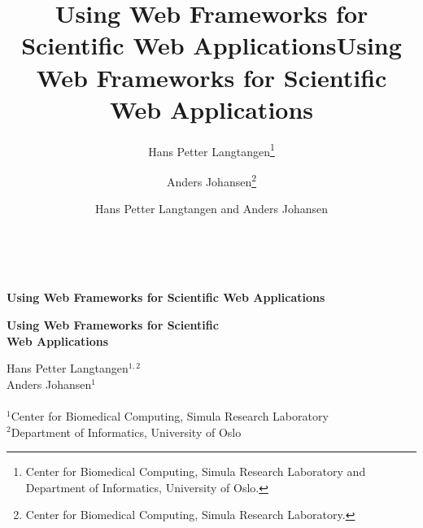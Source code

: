 \documentclass[%
oneside,                 %
final,                   %
10pt]{article}
\begin{document}






\title{Using Web Frameworks for Scientific Web Applications}


\thispagestyle{empty}
\hbox{\ \ }
\vfill
\begin{center}
{\huge{\bfseries{Using Web Frameworks for Scientific Web Applications}}}


\title*{Using Web Frameworks for Scientific Web Applications}


\begin{center}
{\LARGE\bf Using Web Frameworks for Scientific \\ [1.5mm] Web Applications}
\end{center}


\author{Hans Petter Langtangen\footnote{Center for Biomedical Computing, Simula Research Laboratory and Department of Informatics, University of Oslo.}
\and Anders Johansen\footnote{Center for Biomedical Computing, Simula Research Laboratory.}}

\vspace{1.3cm}

    {\Large\textsf{Hans Petter Langtangen${}^{1, 2}$}}\\ [3mm]
    
    {\Large\textsf{Anders Johansen${}^{1}$}}\\ [3mm]
    
\ \\ [2mm]

{\large\textsf{${}^1$Center for Biomedical Computing, Simula Research Laboratory} \\ [1.5mm]}
{\large\textsf{${}^2$Department of Informatics, University of Oslo} \\ [1.5mm]}

\author{Hans Petter Langtangen and Anders Johansen}


\end{center}
\end{document}
